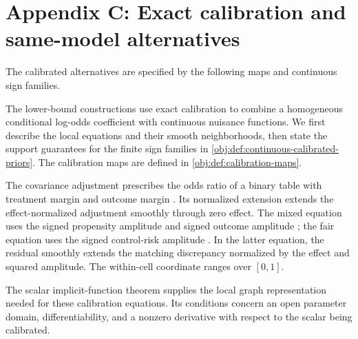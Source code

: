 \section{Appendix C: Exact calibration and same-model alternatives}

The calibrated alternatives are specified by the following maps and continuous sign families.

The lower-bound constructions use exact calibration to combine a homogeneous conditional log-odds coefficient with continuous nuisance functions. We first describe the local equations and their smooth neighborhoods, then state the support guarantees for the finite sign families in \cref{obj:def:continuous-calibrated-priors}. The calibration maps are defined in \cref{obj:def:calibration-maps}.

The covariance adjustment  prescribes the odds ratio of a binary table with treatment margin  and outcome margin . Its normalized extension  extends the effect-normalized adjustment smoothly through zero effect. The mixed equation uses the signed propensity amplitude  and signed outcome amplitude ; the fair equation uses the signed control-risk amplitude . In the latter equation, the residual  smoothly extends the matching discrepancy normalized by the effect and squared amplitude. The within-cell coordinate  ranges over \([0,1]\).

The scalar implicit-function theorem supplies the local graph representation needed for these calibration equations. Its conditions concern an open parameter domain, differentiability, and a nonzero derivative with respect to the scalar being calibrated.


